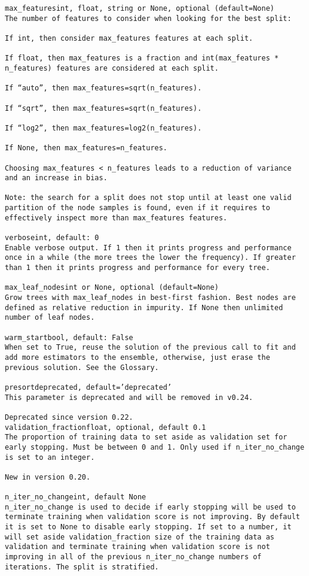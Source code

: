 \documentclass[12pt]{article}
\begin{document}
\begin{verbatim}
max_featuresint, float, string or None, optional (default=None)
The number of features to consider when looking for the best split:

If int, then consider max_features features at each split.

If float, then max_features is a fraction and int(max_features * n_features) features are considered at each split.

If “auto”, then max_features=sqrt(n_features).

If “sqrt”, then max_features=sqrt(n_features).

If “log2”, then max_features=log2(n_features).

If None, then max_features=n_features.

Choosing max_features < n_features leads to a reduction of variance and an increase in bias.

Note: the search for a split does not stop until at least one valid partition of the node samples is found, even if it requires to effectively inspect more than max_features features.

verboseint, default: 0
Enable verbose output. If 1 then it prints progress and performance once in a while (the more trees the lower the frequency). If greater than 1 then it prints progress and performance for every tree.

max_leaf_nodesint or None, optional (default=None)
Grow trees with max_leaf_nodes in best-first fashion. Best nodes are defined as relative reduction in impurity. If None then unlimited number of leaf nodes.

warm_startbool, default: False
When set to True, reuse the solution of the previous call to fit and add more estimators to the ensemble, otherwise, just erase the previous solution. See the Glossary.

presortdeprecated, default=’deprecated’
This parameter is deprecated and will be removed in v0.24.

Deprecated since version 0.22.
validation_fractionfloat, optional, default 0.1
The proportion of training data to set aside as validation set for early stopping. Must be between 0 and 1. Only used if n_iter_no_change is set to an integer.

New in version 0.20.

n_iter_no_changeint, default None
n_iter_no_change is used to decide if early stopping will be used to terminate training when validation score is not improving. By default it is set to None to disable early stopping. If set to a number, it will set aside validation_fraction size of the training data as validation and terminate training when validation score is not improving in all of the previous n_iter_no_change numbers of iterations. The split is stratified.


\end{verbatim}
\end{document}
